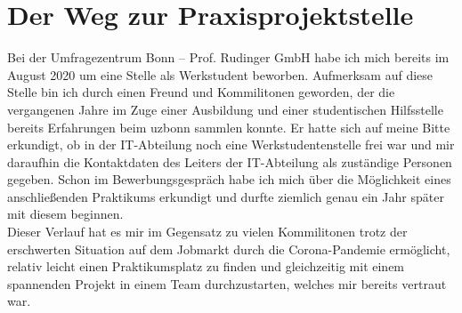 \section{Der Weg zur Praxisprojektstelle}\label{sec:weg-zur-stelle}
Bei der Umfragezentrum Bonn – Prof. Rudinger GmbH habe ich mich bereits im August 2020 um eine Stelle als Werkstudent beworben. Aufmerksam auf diese Stelle bin ich durch einen Freund und Kommilitonen geworden, der die vergangenen Jahre im Zuge einer Ausbildung und einer studentischen Hilfsstelle bereits Erfahrungen beim uzbonn sammlen konnte. Er hatte sich auf meine Bitte erkundigt, ob in der IT-Abteilung noch eine Werkstudentenstelle frei war und mir daraufhin die Kontaktdaten des Leiters der IT-Abteilung als zuständige Personen gegeben. Schon im Bewerbungsgespräch habe ich mich über die Möglichkeit eines anschließenden Praktikums erkundigt und durfte ziemlich genau ein Jahr später mit diesem beginnen. \\ \newline
Dieser Verlauf hat es mir im Gegensatz zu vielen Kommilitonen trotz der erschwerten Situation auf dem Jobmarkt durch die Corona-Pandemie ermöglicht, relativ leicht einen Praktikumsplatz zu finden und gleichzeitig mit einem spannenden Projekt in einem Team durchzustarten, welches mir bereits vertraut war. \newline 


